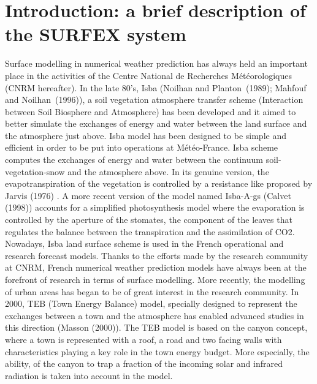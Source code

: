 
\chapter{Introduction: a brief description of the SURFEX system}
\minitoc



Surface modelling in numerical weather prediction has always held an important place in the activities of the Centre National de Recherches M\'et\'eorologiques (CNRM hereafter). In the late 80's, Isba (Noilhan and Planton~(1989)\nocite{Noilhan1989}; Mahfouf and Noilhan~(1996)\nocite{Mahfouf1996}), a soil vegetation atmosphere transfer scheme (Interaction between Soil Biosphere and Atmosphere) has been developed and it aimed to better simulate the exchanges of energy and water between the land surface and the atmosphere just above. Isba model has been designed to be simple and efficient in order to be put into operations at M\'et\'eo-France. Isba scheme computes the exchanges of energy and water between  the continuum soil-vegetation-snow and the atmosphere above. In its genuine version, the evapotranspiration of the vegetation is controlled by a  resistance like proposed by Jarvis (1976)\nocite{Jarvis1976}
. A more recent version of the model named Isba-A-gs (Calvet \etal (1998)\nocite{Calvet1998})
 accounts for a simplified photosynthesis model where the evaporation is controlled by the aperture of the stomates, the component of the leaves that regulates the balance between the transpiration and the assimilation of CO2. Nowadays, Isba land surface scheme is used in the French operational and research forecast models. Thanks to the efforts made by the research community at CNRM, French numerical weather prediction models have always been at the forefront of research in terms of surface modelling. More recently, the modelling of urban areas has began to be of great interest in the research community. In 2000, TEB (Town Energy Balance) model, specially designed to represent the exchanges between a town and the atmosphere has enabled advanced studies in this direction (Masson (2000)\nocite{Masson2000}). The TEB model is based on the canyon concept, where a town is represented with a roof, a road and two facing walls with characteristics playing a key role in the town energy budget. More especially, the ability, of the canyon to trap a fraction of the incoming solar and infrared radiation is taken into account in the model.
